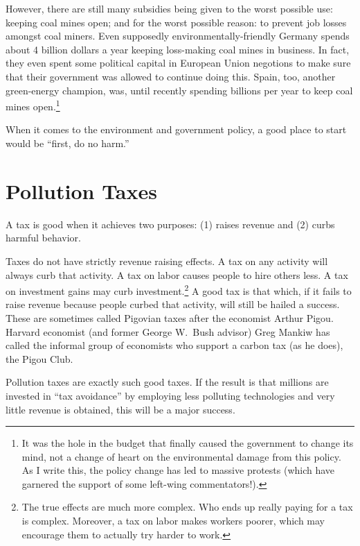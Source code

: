 However, there are still many subsidies being given to the worst possible use:
keeping coal mines open; and for the worst possible reason: to prevent job
losses amongst coal miners. Even supposedly environmentally-friendly Germany
spends about 4 billion dollars a year keeping loss-making coal mines in
business. In fact, they even spent some political capital in European Union
negotions to make sure that their government was allowed to continue doing
this. Spain, too, another green-energy champion, was, until recently spending
billions per year to keep coal mines open.\footnote{It was the hole in the
budget that finally caused the government to change its mind, not a change of
heart on the environmental damage from this policy. As I write this, the policy
change has led to massive protests (which have garnered the support of some
left-wing commentators!).}

When it comes to the environment and government policy, a good place to start
would be ``first, do no harm.''


\section{Pollution Taxes}

A tax is good when it achieves two purposes: (1) raises revenue and (2) curbs
harmful behavior.

Taxes do not have strictly revenue raising effects. A tax on any activity will
always curb that activity. A tax on labor causes people to hire others
less. A tax on investment gains may curb investment.\footnote{The true effects
are much more complex. Who ends up really paying for a tax is complex.
Moreover, a tax on labor makes workers poorer, which may encourage them to
actually try harder to work.} A good tax is that which, if it fails to raise
revenue because people curbed that activity, will still be hailed a success.
These are sometimes called Pigovian taxes after the economist Arthur Pigou.
Harvard economist (and former George W.\ Bush advisor) Greg Mankiw has called
the informal group of economists who support a carbon tax (as he does), the
Pigou Club.

Pollution taxes are exactly such good taxes. If the result is that millions are
invested in ``tax avoidance'' by employing less polluting technologies and very
little revenue is obtained, this will be a major success.


